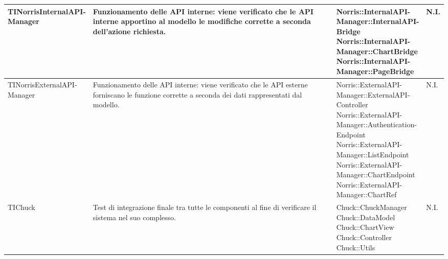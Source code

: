 \begin{longtabu}{| X | X | X[0.9] | X[0.3] |}
	\parbox[t]{0.6\textwidth}{TINorrisInternalAPI-\\Manager}
	&
Funzionamento delle API interne: viene verificato che le API interne apportino al modello le modifiche corrette a seconda dell'azione richiesta.
& \parbox[t]{0.6\textwidth}{
Norris::InternalAPI-\\Manager::InternalAPI-\\Bridge\\
Norris::InternalAPI-\\Manager::ChartBridge\\
Norris::InternalAPI-\\Manager::PageBridge}
			& N.I.
			\\ \hline



	\parbox[t]{0.6\textwidth}{TINorrisExternalAPI-\\Manager}
	&
Funzionamento delle API interne: viene verificato che le API esterne forniscano le funzione corrette a seconda dei dati rappresentati dal modello.
& \parbox[t]{0.6\textwidth}{
Norris::ExternalAPI-\\Manager::ExternalAPI-\\Controller\\
Norris::ExternalAPI-\\Manager::Authentication-\\Endpoint\\
Norris::ExternalAPI-\\Manager::ListEndpoint\\
Norris::ExternalAPI-\\Manager::ChartEndpoint\\
Norris::ExternalAPI-\\Manager::ChartRef}
			& N.I.
			\\ \hline











	TIChuck
				&
Test di integrazione finale tra tutte le componenti al fine di verificare il sistema nel suo complesso.
			& \parbox[t]{0.6\textwidth}{
Chuck::ChuckManager\\
Chuck::DataModel\\
Chuck::ChartView\\
Chuck::Controller\\
Chuck::Utils}
			& N.I.
			\\ \hline




\end{longtabu}
